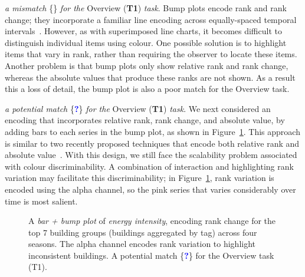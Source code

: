\documentclass[journal]{vgtc}                %
\newcommand*\mismatch{\textcolor{red}{\ding{54}}}
\newcommand*\posmatch{\textcolor{blue}{{\bf ?}}}
\newcommand{\bstart}[1]{\vspace{1mm} \noindent{\textbf{#1:}}}
\begin{document}
\bstart{Bump plots} {\it a mismatch} \{\mismatch\} {\it for the} Overview ({\bf T1}) {\it task}.
Bump plots encode rank and rank change; they incorporate a familiar line encoding across equally-spaced temporal intervals~\cite{Tufte1990}. 
However, as with superimposed line charts, it becomes difficult to distinguish individual items using colour.
One possible solution is to highlight items that vary in rank, rather than requiring the observer to locate these items.
Another problem is that bump plots only show relative rank and rank change, whereas the absolute values that produce these ranks are not shown. 
As a result this a loss of detail, the bump plot is also a poor match for the Overview task.

\bstart{Bump + bar plots} {\it a potential match} \{\posmatch\} {\it for the} Overview ({\bf T1}) {\it task}.
We next considered an encoding that incorporates relative rank, rank change, and absolute value, by adding bars to each series in the bump plot, as shown in Figure~\ref{fig:sandbox-barbump}. 
This approach is similar to two recently proposed techniques that encode both relative rank and absolute value~\cite{Gratzl2013,Hur2013}. 
With this design, we still face the scalability problem associated with colour discriminability.
A combination of interaction and highlighting rank variation may facilitate this discriminability; in Figure~\ref{fig:sandbox-barbump}, rank variation is encoded using the alpha channel, so the pink series that varies considerably over time is most salient.

\begin{figure}[ht]
    \vspace{-0.3cm}
	\centering
	\vspace{-0.15cm}
	\caption{A \textsl{bar + bump plot} of \textsl{energy intensity}, encoding rank change for the top 7 building groups (buildings aggregated by tag) across four seasons. The alpha channel encodes rank variation to highlight inconsistent buildings. A potential match  \{\posmatch\} for the Overview task (T1).}
	\label{fig:sandbox-barbump}
	\vspace{-0.3cm}
\end{figure}
\end{document}
